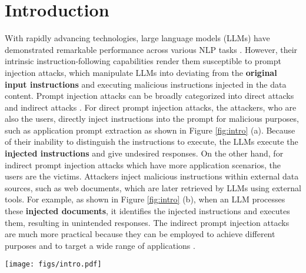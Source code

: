 \section{Introduction}
With rapidly advancing technologies, large language models (LLMs) have demonstrated remarkable performance across various NLP tasks \cite{Chen2021EvaluatingLL, Kojima2022LargeLM, zhou2023leasttomost}. However, their intrinsic instruction-following capabilities render them susceptible to prompt injection attacks, which manipulate LLMs into deviating from the \textbf{original input instructions} and executing malicious instructions injected in the data content.
Prompt injection attacks can be broadly categorized into direct attacks \cite{perez2022ignore, chen2024struq} and indirect attacks \cite{greshake2023not,li2023evaluating, zhan2024injecagent}. 
For direct prompt injection attacks, the attackers, who are also the users, directly inject instructions into the prompt for malicious purposes, such as application prompt extraction \cite{perez2022ignore} as shown in Figure \ref{fig:intro} (a). Because of their inability to distinguish the instructions to execute, the LLMs execute the \textbf{injected instructions} and give undesired responses.  
On the other hand, for indirect prompt injection attacks which have more application scenarios, the users are the victims. Attackers inject malicious instructions within external data sources, such as web documents, which are later retrieved by LLMs using external tools. For example, as shown in Figure \ref{fig:intro} (b), when an LLM processes these \textbf{injected documents}, it identifies the injected instructions and executes them, resulting in unintended responses. The indirect prompt injection attacks are much more practical because they can be employed to achieve different purposes \cite{liu2024automatic, shu2023exploitability} and to target a wide range of applications \cite{greshake2023not}.

\begin{figure*}
    \centering
    \texttt{[image: figs/intro.pdf]}
    \caption{(a) represents a direct prompt injection attack example and (b) illustrates an indirect prompt injection attack example.}
    \label{fig:intro}
    \vspace{-5pt}
\end{figure*}

